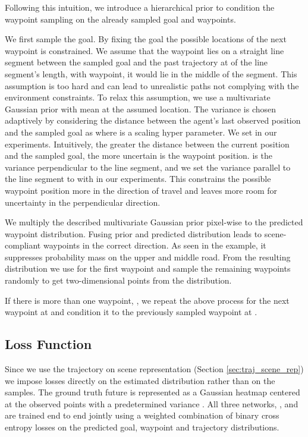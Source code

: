 \documentclass[final]{cvpr}
\begin{document}
Following this intuition, we introduce a hierarchical prior to condition the waypoint sampling on the already sampled goal and waypoints.

We first sample the goal. By fixing the goal the possible locations of the next waypoint is constrained. We assume that the waypoint lies on a straight line segment between the sampled goal and the past trajectory at  of the line segment's length, \eg with  waypoint, it would lie in the middle of the segment. This assumption is too hard and can lead to unrealistic paths not complying with the environment constraints. To relax this assumption, we use a multivariate Gaussian prior with mean at the assumed location. The variance is chosen adaptively by considering the distance between the agent's last observed position and the sampled goal as  where  is a scaling hyper parameter. We set  in our experiments. Intuitively, the greater the distance between the current position and the sampled goal, the more uncertain is the waypoint position.  is the variance perpendicular to the line segment, and we set the variance parallel to the line segment to  with  in our experiments. This constrains the possible waypoint position more in the direction of travel and leaves more room for uncertainty in the perpendicular direction.

We multiply the described multivariate Gaussian prior pixel-wise to the predicted waypoint distribution. Fusing prior and predicted distribution leads to scene-compliant waypoints in the correct direction. As seen in the example, it suppresses probability mass on the upper and middle road. From the resulting distribution we use  for the first waypoint and sample the remaining  waypoints randomly to get two-dimensional points from the distribution.

If there is more than one waypoint, \ie , we repeat the above process for the next waypoint at  and condition it to the previously sampled waypoint at .

\subsection{Loss Function}
\label{sec:loss}
Since we use the trajectory on scene representation (Section \ref{sec:traj_scene_rep}) we impose losses directly on the estimated distribution  rather than on the samples. The ground truth future is represented as a Gaussian heatmap  centered at the observed points with a predetermined variance . All three networks, ,  and  are trained end to end jointly using a weighted combination of binary cross entropy losses on the predicted goal, waypoint and trajectory distributions. 
\end{document}

